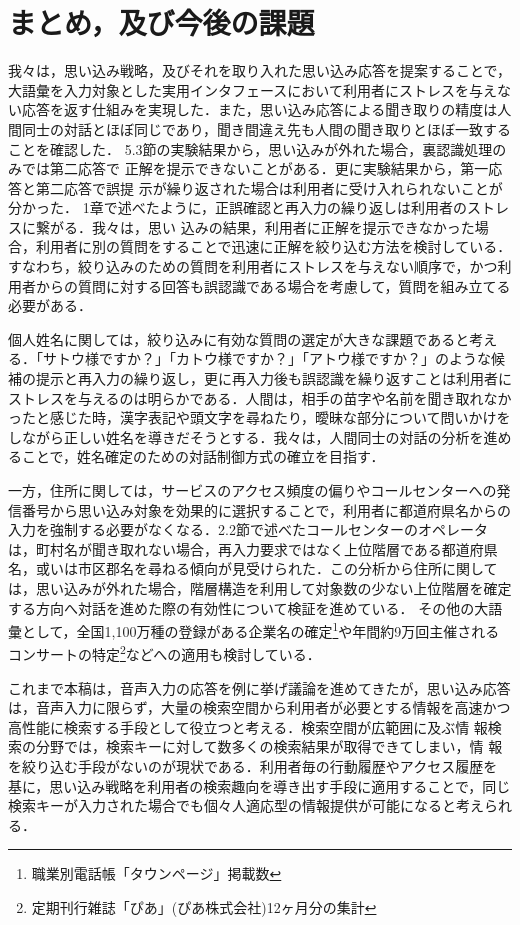 \section{まとめ，及び今後の課題}
\label{six}
我々は，思い込み戦略，及びそれを取り入れた思い込み応答を提案することで，
大語彙を入力対象とした実用インタフェースにおいて利用者にストレスを与えな
い応答を返す仕組みを実現した．また，思い込み応答による聞き取りの精度は人間同士の対話とほぼ同じであり，聞き間違え先も人間の聞き取りとほぼ一致することを確認した．
5.3節の実験結果から，思い込みが外れた場合，裏認識処理のみでは第二応答で
正解を提示できないことがある．更に実験結果から，第一応答と第二応答で誤提
示が繰り返された場合は利用者に受け入れられないことが分かった．
1章で述べたように，正誤確認と再入力の繰り返しは利用者のストレスに繋がる．我々は，思い
込みの結果，利用者に正解を提示できなかった場合，利用者に別の質問をすることで迅速に正解を絞り込む方法を検討している．
すなわち，絞り込みのための質問を利用者にストレスを与えない順序で，かつ利用者からの質問に対する回答も誤認識である場合を考慮して，質問を組み立てる必要がある．

個人姓名に関しては，絞り込みに有効な質問の選定が大きな課題であると考える．「サトウ様ですか？」「カトウ様ですか？」「アトウ様ですか？」のような候補の提示と再入力の繰り返し，更に再入力後も誤認識を繰り返すことは利用者にストレスを与えるのは明らかである．人間は，相手の苗字や名前を聞き取れなかったと感じた時，漢字表記や頭文字を尋ねたり，曖昧な部分について問いかけをしながら正しい姓名を導きだそうとする．我々は，人間同士の対話の分析を進めることで，姓名確定のための対話制御方式の確立を目指す．

一方，住所に関しては，サービスのアクセス頻度の偏りやコールセンターへの発信番号から思い込み対象を効果的に選択することで，利用者に都道府県名からの入力を強制する必要がなくなる．2.2節で述べたコールセンターのオペレータは，町村名が聞き取れない場合，再入力要求ではなく上位階層である都道府県名，或いは市区郡名を尋ねる傾向が見受けられた．この分析から住所に関しては，思い込みが外れた場合，階層構造を利用して対象数の少ない上位階層を確定する方向へ対話を進めた際の有効性について検証を進めている．
その他の大語彙として，全国1,100万種の登録がある企業名の確定\footnote{職業別電話帳「タウンページ」掲載数}や年間約9万回主催されるコンサートの特定\footnote{定期刊行雑誌「ぴあ」(ぴあ株式会社)12ヶ月分の集計}などへの適用も検討している．

これまで本稿は，音声入力の応答を例に挙げ議論を進めてきたが，思い込み応答
は，音声入力に限らず，大量の検索空間から利用者が必要とする情報を高速かつ
高性能に検索する手段として役立つと考える．検索空間が広範囲に及ぶ情
報検索の分野では，検索キーに対して数多くの検索結果が取得できてしまい，情
報を絞り込む手段がないのが現状である．利用者毎の行動履歴やアクセス履歴を
基に，思い込み戦略を利用者の検索趣向を導き出す手段に適用することで，同じ検索キーが入力された場合でも個々人適応型の情報提供が可能になると考えられる．


